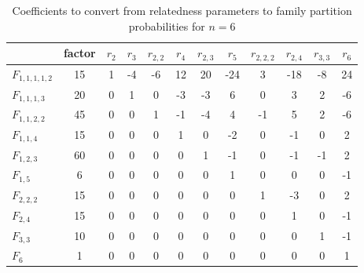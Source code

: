 \begin{table}[h]
\centering
\caption{Coefficients to convert from relatedness parameters to family partition probabilities for $n=6$}
\begin{tabular}{lccccccccccc}
\toprule
                &  factor &  $r_{2}$ &  $r_{3}$ &  $r_{2,2}$ &  $r_{4}$ &  $r_{2,3}$ &  $r_{5}$ &  $r_{2,2,2}$ &  $r_{2,4}$ &  $r_{3,3}$ &  $r_{6}$ \\
\midrule
$F_{1,1,1,1,2}$ &      15 &        1 &       -4 &         -6 &       12 &         20 &      -24 &            3 &        -18 &         -8 &       24 \\
  $F_{1,1,1,3}$ &      20 &        0 &        1 &          0 &       -3 &         -3 &        6 &            0 &          3 &          2 &       -6 \\
  $F_{1,1,2,2}$ &      45 &        0 &        0 &          1 &       -1 &         -4 &        4 &           -1 &          5 &          2 &       -6 \\
    $F_{1,1,4}$ &      15 &        0 &        0 &          0 &        1 &          0 &       -2 &            0 &         -1 &          0 &        2 \\
    $F_{1,2,3}$ &      60 &        0 &        0 &          0 &        0 &          1 &       -1 &            0 &         -1 &         -1 &        2 \\
      $F_{1,5}$ &       6 &        0 &        0 &          0 &        0 &          0 &        1 &            0 &          0 &          0 &       -1 \\
    $F_{2,2,2}$ &      15 &        0 &        0 &          0 &        0 &          0 &        0 &            1 &         -3 &          0 &        2 \\
      $F_{2,4}$ &      15 &        0 &        0 &          0 &        0 &          0 &        0 &            0 &          1 &          0 &       -1 \\
      $F_{3,3}$ &      10 &        0 &        0 &          0 &        0 &          0 &        0 &            0 &          0 &          1 &       -1 \\
        $F_{6}$ &       1 &        0 &        0 &          0 &        0 &          0 &        0 &            0 &          0 &          0 &        1 \\
\bottomrule
\end{tabular}
\end{table}

